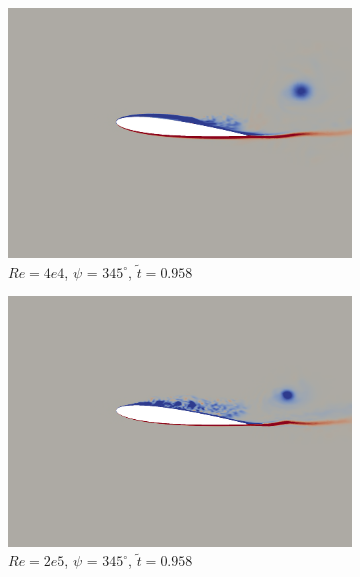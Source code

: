 \begin{figure}[H]
	\begin{subfigure}[b]{0.32\textwidth}
		\centering
		\includegraphics[width=1\textwidth]{figures/Vorticity_plots/Re_40k_1pt0/phase_345.png}
		\caption{$Re=4e4$, $\psi$ = $345^\circ$, $\tilde{t}=0.958$}
		\label{fig:Re_40k_1pt0_phi345}
	\end{subfigure}
	\begin{subfigure}[b]{0.32\textwidth}
		\centering
		\includegraphics[width=1\textwidth]{figures/Vorticity_plots/Re_200k_1pt0/phase_345.png}
		\caption{$Re=2e5$, $\psi$ = $345^\circ$, $\tilde{t}=0.958$}
		\label{fig:Re_200k_1pt0_phi345}
	\end{subfigure}
	\begin{subfigure}[b]{0.32\textwidth}
		\centering

\end{subfigure}
\end{figure}

